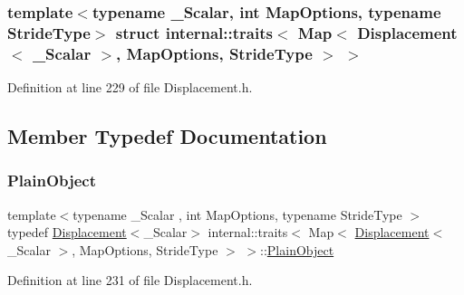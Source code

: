 \subsubsection*{template$<$typename \+\_\+\+Scalar, int Map\+Options, typename Stride\+Type$>$\newline
struct internal\+::traits$<$ Map$<$ Displacement$<$ \+\_\+\+Scalar $>$, Map\+Options, Stride\+Type $>$ $>$}



Definition at line 229 of file Displacement.\+h.



\subsection{Member Typedef Documentation}
\hypertarget{structinternal_1_1traits_3_01_map_3_01_displacement_3_01___scalar_01_4_00_01_map_options_00_01_stride_type_01_4_01_4_a731702958c8fe6e17c7ecfa15d75e5d0}{}\label{structinternal_1_1traits_3_01_map_3_01_displacement_3_01___scalar_01_4_00_01_map_options_00_01_stride_type_01_4_01_4_a731702958c8fe6e17c7ecfa15d75e5d0} 
\subsubsection{\texorpdfstring{Plain\+Object}{PlainObject}}
{\footnotesize\ttfamily template$<$typename \+\_\+\+Scalar , int Map\+Options, typename Stride\+Type $>$ \\
typedef \hyperlink{class_displacement}{Displacement}$<$\+\_\+\+Scalar$>$ internal\+::traits$<$ Map$<$ \hyperlink{class_displacement}{Displacement}$<$ \+\_\+\+Scalar $>$, Map\+Options, Stride\+Type $>$ $>$\+::\hyperlink{structinternal_1_1traits_3_01_map_3_01_displacement_3_01___scalar_01_4_00_01_map_options_00_01_stride_type_01_4_01_4_a731702958c8fe6e17c7ecfa15d75e5d0}{Plain\+Object}}



Definition at line 231 of file Displacement.\+h.

\hypertarget{structinternal_1_1traits_3_01_map_3_01_displacement_3_01___scalar_01_4_00_01_map_options_00_01_stride_type_01_4_01_4_af622b2eb414fa4600a591d0b6ae51f8d}{}\label{structinternal_1_1traits_3_01_map_3_01_displacement_3_01___scalar_01_4_00_01_map_options_00_01_stride_type_01_4_01_4_af622b2eb414fa4600a591d0b6ae51f8d} 

